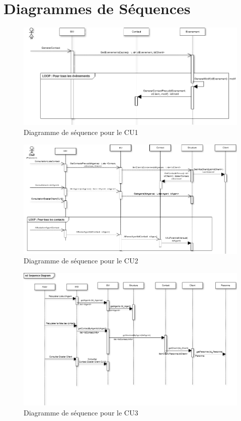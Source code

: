 \section{Diagrammes de Séquences}

\begin{figure}[H]
	\begin{center}
		\includegraphics[scale=0.4]{Includes/SOA-Sequence-CU1.png}
		\caption{Diagramme de séquence pour le CU1}
	\end{center}
\end{figure}

\begin{figure}[H]
	\begin{center}
		\includegraphics[scale=0.4]{Includes/SOA-Sequence-CU2.png}
		\caption{Diagramme de séquence pour le CU2}
	\end{center}
\end{figure}

\begin{figure}[H]
	\begin{center}
		\includegraphics[scale=0.4]{Includes/SOA-Sequence-CU3.png}
		\caption{Diagramme de séquence pour le CU3}
	\end{center}
\end{figure}

